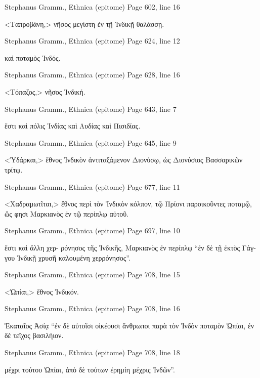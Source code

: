 \documentclass[12pt,letterpaper,twoside,final]{memoir}
\begin{document}
\begin{greek}
Stephanus Gramm., Ethnica (epitome) 
Page 602, line 16

<Ταπροβάνη,> νῆσος μεγίστη ἐν τῇ Ἰνδικῇ θαλάσσῃ. 



Stephanus Gramm., Ethnica (epitome) 
Page 624, line 12

                                           καὶ ποταμὸς Ἰνδός. 



Stephanus Gramm., Ethnica (epitome) 
Page 628, line 16

<Τόπαζος,> νῆσος Ἰνδική. 



Stephanus Gramm., Ethnica (epitome) 
Page 643, line 7

                                                                   ἔστι καὶ 
πόλις Ἰνδίας καὶ Λυδίας καὶ Πισιδίας. 



Stephanus Gramm., Ethnica (epitome) 
Page 645, line 9

<Ὑδάρκαι,> ἔθνος Ἰνδικὸν ἀντιταξάμενον Διονύσῳ, ὡς 
Διονύσιος Βασσαρικῶν τρίτῳ. 



Stephanus Gramm., Ethnica (epitome) 
Page 677, line 11

<Χαδραμωτῖται,> ἔθνος περὶ τὸν Ἰνδικὸν κόλπον, τῷ 
Πρίονι παροικοῦντες ποταμῷ, ὥς φησι Μαρκιανὸς ἐν τῷ 
περίπλῳ αὐτοῦ. 



Stephanus Gramm., Ethnica (epitome) 
Page 697, line 10

                                               ἔστι καὶ ἄλλη χερ-
ρόνησος τῆς Ἰνδικῆς, Μαρκιανὸς ἐν περίπλῳ “ἐν δὲ τῇ ἐκτὸς 
Γάγγου Ἰνδικῇ χρυσῆ καλουμένη χερρόνησος”. 



Stephanus Gramm., Ethnica (epitome) 
Page 708, line 15

<Ὠπίαι,> ἔθνος Ἰνδικόν. 



Stephanus Gramm., Ethnica (epitome) 
Page 708, line 16

                                     Ἑκαταῖος Ἀσίᾳ “ἐν δὲ αὐτοῖσι 
οἰκέουσι ἄνθρωποι παρὰ τὸν Ἰνδὸν ποταμὸν Ὠπίαι, ἐν δὲ 
τεῖχος βασιλήιον. 



Stephanus Gramm., Ethnica (epitome) 
Page 708, line 18

                    μέχρι τούτου Ὠπίαι, ἀπὸ δὲ τούτων ἐρημίη 
μέχρις Ἰνδῶν”. 




\end{greek}
\end{document}
